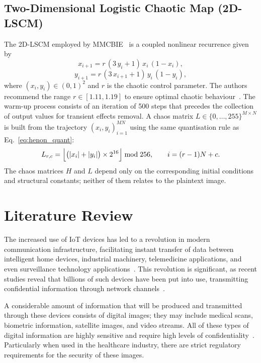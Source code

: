 \subsection{Two-Dimensional Logistic Chaotic Map (2D-LSCM)}

The 2D-LSCM employed by MMCBIE~\cite{hua2019cosine} is a coupled
nonlinear recurrence given by
\begin{equation}
    x_{i+1} = r\,(3\,y_i + 1)\,x_i\,(1 - x_i),
    \label{eq:lscm_x}
\end{equation}
\begin{equation}
    y_{i+1} = r\,(3\,x_{i+1} + 1)\,y_i\,(1 - y_i),
    \label{eq:lscm_y}
\end{equation}
where $(x_i, y_i) \in (0,1)^2$ and $r$ is the chaotic control
parameter.
The authors recommend the range $r \in [1.11, 1.19]$ to ensure
optimal chaotic behaviour~\cite{hua2019cosine}.
The warm-up process consists of an iteration of 500 steps that precedes
the collection of output values for transient effects removal.
A chaos matrix $L \in \{0,\ldots,255\}^{M \times N}$ is built
from the trajectory $(x_i, y_i)_{i=1}^{MN}$ using the same
quantisation rule as Eq.~\eqref{eq:henon_quant}:
\begin{equation}
    L_{r,c}
    = \Bigl\lfloor
        \bigl(\lvert x_i \rvert + \lvert y_i \rvert\bigr)
        \times 2^{16}
      \Bigr\rfloor \bmod 256,
    \qquad i = (r-1)N + c.
    \label{eq:lscm_quant}
\end{equation}
The chaos matrices $H$ and $L$ depend only on the corresponding initial
conditions and structural constants; neither of them relates to the
plaintext image.
\section{Literature Review}
\label{sec:lad-litreview}


The increased use of IoT devices has led to a revolution
in modern communication infrastructure, facilitating instant transfer
of data between intelligent home devices, industrial machinery,
telemedicine applications, and even surveillance technology
applications~\cite{atzori2010iot}.
This revolution is significant, as recent studies reveal that
billions of such devices have been put into use, transmitting confidential information through network channels~\cite{shafique2020iot5g}.

A considerable amount of information that will be produced and
transmitted through these devices consists of digital images; they may include
medical scans, biometric information, satellite images, and video streams.
All of these types of digital information are highly sensitive and require
high levels of confidentiality~\cite{nauman2020miot}. Particularly when used in the healthcare industry, there
are strict regulatory requirements for the security of these images.

